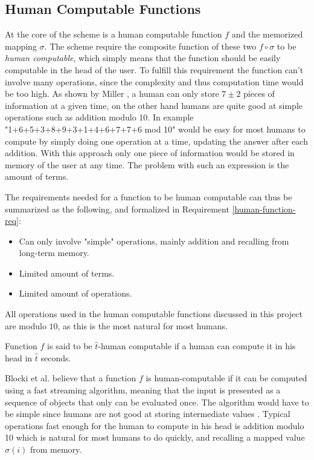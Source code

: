 \subsection{Human Computable Functions}\label{human-func}
At the core of the scheme is a human computable function $f$ and the memorized mapping $\sigma$. The scheme require the composite function of these two $f \circ \sigma$ to be \emph{human computable}, which simply means that the function should be easily computable in the head of the user. To fulfill this requirement the function can't involve many operations, since the complexity and thus computation time would be too high. As shown by Miller \cite{magic-seven_miller}, a human can only store $7 \pm 2$ pieces of information at a given time, on the other hand humans are quite good at simple operations such as addition modulo 10. In example "1+6+5+3+8+9+3+1+4+6+7+7+6 mod 10" would be easy for most humans to compute by simply doing one operation at a time, updating the answer after each addition. With this approach only one piece of information would be stored in memory of the user at any time. The problem with such an expression is the amount of terms. 
\par The requirements needed for a function to be human computable can thus be summarized as the following, and formalized in Requirement \ref{human-function-req}:
\begin{itemize}
    \item Can only involve "simple" operations, mainly addition and recalling from long-term memory.
    \item Limited amount of terms.
    \item Limited amount of operations.
\end{itemize}
\begin{remark}
    All operations used in the human computable functions discussed in this project are modulo $10$, as this is the most natural for most humans.
\end{remark}
\begin{requirement}
    \label{human-function-req}
    Function $f$ is said to be $\hat t$-human computable if a human can compute it in his head in $\hat t$ seconds.
\end{requirement}

\par Blocki et al. \cite{hcp-blocki} believe that a function $f$ is human-computable if it can be computed using a fast streaming algorithm, meaning that the input is presented as a sequence of objects that only can be evaluated once. The algorithm would have to be simple since humans are not good at storing intermediate values \cite{magic-seven_miller}. Typical operations fast enough for the human to compute in his head is addition modulo 10 which is natural for most humans to do quickly, and recalling a mapped value $\sigma(i)$ from memory.

